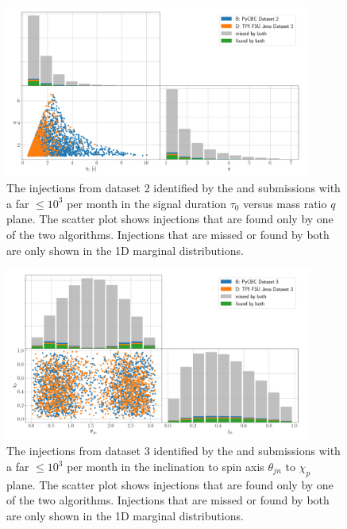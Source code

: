 \begin{figure}
    \centering
    \includegraphics[width=0.9\textwidth]{chapters/mdc/images/tau0q_found_ds2_pycbc_TPI_FSU_Jena_plot.pdf}
    \caption[Found-missed template duration versus mass ratio]{The injections from dataset 2 identified by the \pycbc and \jena submissions with a \acrshort{far} $\leq 10^3$ per month in the signal duration $\tau_0$ versus mass ratio $q$ plane. The scatter plot shows injections that are found only by one of the two algorithms. Injections that are missed or found by both are only shown in the 1D marginal distributions.}
    \label{fig:ds2tq}
\end{figure}
\begin{figure}
    \centering
    \includegraphics[width=0.9\textwidth]{chapters/mdc/images/chitheta_found_ds3_pycbc_TPI_FSU_Jena_plot.pdf}
    \caption[Found-missed effective precessing spin versus inclination]{The injections from dataset 3 identified by the \pycbc and \jena submissions with a \acrshort{far} $\leq 10^3$ per month in the inclination to spin axis $\theta_{jn}$ to $\chi_p$ plane. The scatter plot shows injections that are found only by one of the two algorithms. Injections that are missed or found by both are only shown in the 1D marginal distributions.}
    \label{fig:ds3chitheta}
\end{figure}